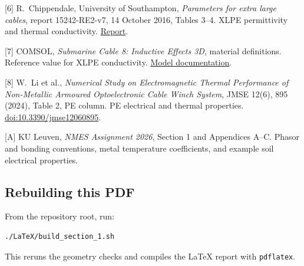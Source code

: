 \documentclass[11pt,a4paper]{article}
\newcommand{\source}[2]{\href{#1}{#2}}
\begin{document}
[6] R.~Chippendale, University of Southampton, \textit{Parameters for extra
large cables}, report 15242-RE2-v7, 14 October 2016, Tables 3--4.
XLPE permittivity and thermal conductivity.
\source{https://www.transmissionexcel.com/wp-content/uploads/2016/11/Parameters-for-extra-large-cables-FINAL.pdf}{Report}.

[7] COMSOL, \textit{Submarine Cable 8: Inductive Effects 3D}, material
definitions. Reference value for XLPE conductivity.
\source{https://doc.comsol.com/6.4/doc/com.comsol.help.models.acdc.submarine_cable_08_inductive_effects_3d/submarine_cable_08_inductive_effects_3d.html}{Model documentation}.

[8] W.~Li et al., \textit{Numerical Study on Electromagnetic Thermal
Performance of Non-Metallic Armoured Optoelectronic Cable Winch System},
JMSE 12(6), 895 (2024), Table 2, PE column. PE electrical and thermal
properties.
\source{https://doi.org/10.3390/jmse12060895}{doi:10.3390/jmse12060895}.

[A] KU Leuven, \textit{NMES Assignment 2026}, Section 1 and Appendices A--C.
Phasor and bonding conventions, metal temperature coefficients, and example
soil electrical properties.
\endgroup
\subsection*{Rebuilding this PDF}
From the repository root, run:
\begin{lstlisting}[style=command]
./LaTeX/build_section_1.sh
\end{lstlisting}
This reruns the geometry checks and compiles the LaTeX report with \texttt{pdflatex}.
\end{document}
